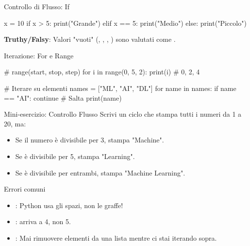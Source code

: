 \documentclass[12pt,aspectratio=169,notheorems]{beamer}
\begin{document}
\begin{frame}[fragile]{Controllo di Flusso: If}
    \begin{python}
        x = 10
        if x > 5:
            print("Grande")
        elif x == 5:
            print("Medio")
        else:
            print("Piccolo")
    \end{python}
    \textbf{Truthy/Falsy}: Valori "vuoti" (, \pythoninline{[]}, , ) sono valutati come .
\end{frame}

\begin{frame}[fragile]{Iterazione: For e Range}
    \begin{python}
        # range(start, stop, step)
        for i in range(0, 5, 2):
            print(i) # 0, 2, 4

        # Iterare su elementi
        names = ["ML", "AI", "DL"]
        for name in names:
            if name == "AI":
                continue # Salta
        print(name)
    \end{python}
\end{frame}

\begin{frame}{Mini-esercizio: Controllo Flusso}
    Scrivi un ciclo che stampa tutti i numeri da 1 a 20, ma:
    \begin{itemize}
        \item Se il numero è divisibile per 3, stampa "Machine".
        \item Se è divisibile per 5, stampa "Learning".
        \item Se è divisibile per entrambi, stampa "Machine Learning".
    \end{itemize}
\end{frame}

\begin{frame}{Errori comuni}
    \begin{itemize}
        \item {}: Python usa gli spazi, non le graffe!
        \item {}:  arriva a 4, non 5.
        \item {}: Mai rimuovere elementi da una lista mentre ci stai iterando sopra.
    \end{itemize}
\end{frame}

\end{document}
